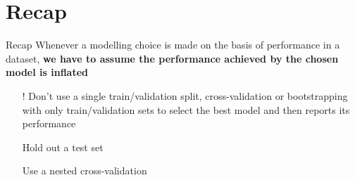 \section{Recap}

\begin{frame}{Recap}
    Whenever a modelling choice is made on the basis of
    performance in a dataset, \textbf{we have to assume the
    performance achieved by the chosen model is inflated}
    \begin{itemize}
        \item[!] Don't use a single train/validation split, cross-validation or bootstrapping with only train/validation sets to select the best model and then reports its performance
        \item[\textrightarrow] Hold out a test set
        \item[\textrightarrow] Use a nested cross-validation
    \end{itemize}
\end{frame}
